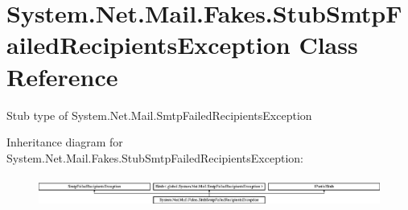 \hypertarget{class_system_1_1_net_1_1_mail_1_1_fakes_1_1_stub_smtp_failed_recipients_exception}{\section{System.\-Net.\-Mail.\-Fakes.\-Stub\-Smtp\-Failed\-Recipients\-Exception Class Reference}
\label{class_system_1_1_net_1_1_mail_1_1_fakes_1_1_stub_smtp_failed_recipients_exception}
}


Stub type of System.\-Net.\-Mail.\-Smtp\-Failed\-Recipients\-Exception 


Inheritance diagram for System.\-Net.\-Mail.\-Fakes.\-Stub\-Smtp\-Failed\-Recipients\-Exception\-:\begin{figure}[H]
\begin{center}
\leavevmode
\includegraphics[height=0.982456cm]{class_system_1_1_net_1_1_mail_1_1_fakes_1_1_stub_smtp_failed_recipients_exception}
\end{center}
\end{figure}
